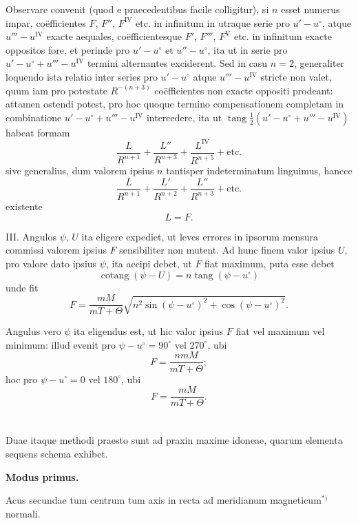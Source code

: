 \documentclass[fontsize=11pt,paper=a4,twoside,openany]{scrbook}
\DeclareMathOperator{\tang}{tang}
\DeclareMathOperator{\cotang}{cotang}
\begin{document}
Observare convenit (quod e praecedentibus facile colligitur), si $n$ esset numerus impar, coëfficientes $F$, $F''$, $F^{\mathrm{IV}}$ etc. in infinitum in utraque serie pro $u'-u^{\circ}$, atque $u'''-u^{\mathrm{IV}}$ exacte aequales, coëfficientesque $F'$, $F'''$, $F^{\mathrm{V}}$ etc. in infinitum exacte oppositos fore, et perinde pro $u'-u^{\circ}$ et $u''-u^{\circ}$, ita ut in serie pro $u'-u^{\circ}+u'''-u^{\mathrm{IV}}$ termini alternantes exciderent. Sed in casu $n=2$, generaliter loquendo ista relatio inter series pro $u'-u^{\circ}$ atque $u'''-u^{\mathrm{IV}}$ stricte non valet, quum iam pro potestate $R^{-(n+3)}$ coëfficientes non exacte oppositi prodeant: attamen ostendi potest, pro hoc quoque termino compensationem completam in combinatione $u'-u^{\circ}+u'''-u^{\mathrm{IV}}$ intercedere, ita ut $\tang\frac{1}{2}(u'-u^{\circ}+u'''-u^{\mathrm{IV}})$ habeat formam
\[
\frac{L}{R^{n+1}} + \frac{L''}{R^{n+3}} + \frac{L^{\mathrm{IV}}}{R^{n+5}} + \text{etc.}
\]
sive generalius, dum valorem ipsius $n$ tantisper indeterminatum linguimus, hancce
\[
\frac{L}{R^{n+1}} + \frac{L'}{R^{n+2}} + \frac{L''}{R^{n+3}} + \text{etc.}
\]
existente
\[
L = F.
\]

III. Angulos $\psi$, $U$ ita eligere expediet, ut leves errores in ipsorum mensura commissi valorem ipsius $F$ sensibiliter non mutent. Ad hunc finem valor ipsius $U$, pro valore dato ipsius $\psi$, ita accipi debet, ut $F$ fiat maximum, puta esse debet
\[
\cotang(\psi-U) = n\tang(\psi-u^{\circ})
\]
unde fit
\[
F = \frac{mM}{mT+\Theta}\sqrt{n^2\sin(\psi-u^{\circ})^2+\cos(\psi-u^{\circ})^2}.
\]

Angulus vero $\psi$ ita eligendus est, ut hic valor ipsius $F$ fiat vel maximum vel minimum: illud evenit pro $\psi-u^{\circ}=90^\circ$ vel $270^\circ$, ubi
\[
F = \frac{nmM}{mT+\Theta};
\]
hoc pro $\psi-u^{\circ}=0$ vel $180^\circ$, ubi
\[
F = \frac{mM}{mT+\Theta}.
\]

\section{}

Duae itaque methodi praesto sunt ad praxin maxime idoneae, quarum elementa sequens schema exhibet.

\medskip
\textbf{Modus primus.}

Acus secundae tum centrum tum axis in recta ad meridianum magneticum$^{*)}$ normali.
\end{document}
